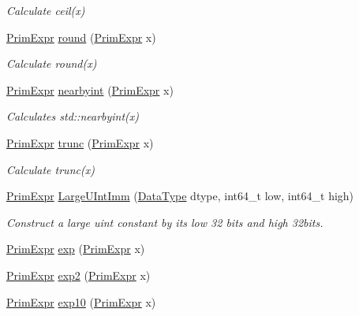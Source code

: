 \begin{DoxyCompactItemize}
\begin{DoxyCompactList}\small\item\em Calculate ceil(x) \end{DoxyCompactList}\item 
\hyperlink{classtvm_1_1PrimExpr}{Prim\+Expr} \hyperlink{namespacetvm_a660170263d6864b1caa60728619971be}{round} (\hyperlink{classtvm_1_1PrimExpr}{Prim\+Expr} x)
\begin{DoxyCompactList}\small\item\em Calculate round(x) \end{DoxyCompactList}\item 
\hyperlink{classtvm_1_1PrimExpr}{Prim\+Expr} \hyperlink{namespacetvm_a8472b5c842e840063564d4280428ce23}{nearbyint} (\hyperlink{classtvm_1_1PrimExpr}{Prim\+Expr} x)
\begin{DoxyCompactList}\small\item\em Calculates std\+::nearbyint(x) \end{DoxyCompactList}\item 
\hyperlink{classtvm_1_1PrimExpr}{Prim\+Expr} \hyperlink{namespacetvm_ae17d5a4cdf12b4da457d4929030592cf}{trunc} (\hyperlink{classtvm_1_1PrimExpr}{Prim\+Expr} x)
\begin{DoxyCompactList}\small\item\em Calculate trunc(x) \end{DoxyCompactList}\item 
\hyperlink{classtvm_1_1PrimExpr}{Prim\+Expr} \hyperlink{namespacetvm_a1b6f1345a0ac2506132b15ec4cbf3599}{Large\+U\+Int\+Imm} (\hyperlink{namespacetvm_a41918af1a1dc386388639a9d3ad06c5d}{Data\+Type} dtype, int64\+\_\+t low, int64\+\_\+t high)
\begin{DoxyCompactList}\small\item\em Construct a large uint constant by its low 32 bits and high 32bits. \end{DoxyCompactList}\item 
\hyperlink{classtvm_1_1PrimExpr}{Prim\+Expr} \hyperlink{namespacetvm_aa21f5c2f67c944561ae4a260a2ed14d2}{exp} (\hyperlink{classtvm_1_1PrimExpr}{Prim\+Expr} x)
\item 
\hyperlink{classtvm_1_1PrimExpr}{Prim\+Expr} \hyperlink{namespacetvm_a21e3a5d7327cf37c6a682525665a0a28}{exp2} (\hyperlink{classtvm_1_1PrimExpr}{Prim\+Expr} x)
\item 
\hyperlink{classtvm_1_1PrimExpr}{Prim\+Expr} \hyperlink{namespacetvm_ac760569fe43a52f3f8997461b2ef438a}{exp10} (\hyperlink{classtvm_1_1PrimExpr}{Prim\+Expr} x)
\item 

\end{DoxyCompactItemize}
